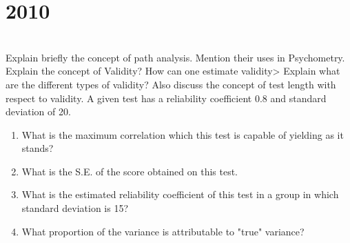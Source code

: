 \section*{2010}
\vspace{-.5cm}
\hrulefill \smallskip\\
Explain briefly the concept of path analysis. Mention their uses in Psychometry.
\myline
{} Explain the concept of Validity? How can one estimate validity> Explain what are the different types of validity? Also discuss the concept of test length with respect to validity.
\myline
{} A given test has a reliability coefficient 0.8 and standard deviation of 20.
\begin{enumerate}[label=(\roman*)]
\itemsep0em 
\item What is the maximum correlation which this test is capable of yielding as it stands?
\item What is the S.E. of the score obtained on this test.
\item What is the estimated reliability coefficient of this test in a group in which standard deviation is 15?
\item What proportion of the variance is attributable to "true" variance?
\end{enumerate}